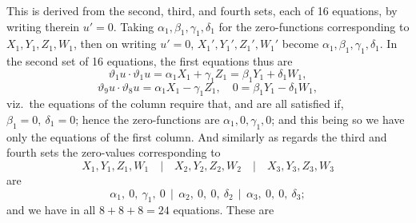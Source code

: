 \documentclass[11pt]{article}
\begin{document}
This is derived from the second, third, and fourth sets, each of 16 equations, by writing therein $u' = 0$. Taking $\alpha_1,\beta_1,\gamma_1,\delta_1$ for the zero-functions corresponding to $X_1, Y_1, Z_1, W_1$, then on writing $u' = 0$, $X_1', Y_1', Z_1', W_1'$ become $\alpha_1,\beta_1,\gamma_1,\delta_1$. In the second set of 16 equations, the first equations thus are
\[
\vartheta_1 u\cdot\vartheta_1 u = \alpha_1 X_1 + \gamma_1 Z_1 = \beta_1 Y_1 + \delta_1 W_1,
\]
\[
\vartheta_9 u\cdot\vartheta_8 u = \alpha_1 X_1 - \gamma_1 Z_1,\quad 0 = \beta_1 Y_1 - \delta_1 W_1,
\]
viz.\ the equations of the column require that, and are all satisfied if, $\beta_1 = 0,\ \delta_1 = 0$; hence the zero-functions are $\alpha_1, 0, \gamma_1, 0$; and this being so we have only the equations of the first column. And similarly as regards the third and fourth sets the zero-values corresponding to
\[
X_1, Y_1, Z_1, W_1\quad|\quad X_2, Y_2, Z_2, W_2\quad|\quad X_3, Y_3, Z_3, W_3
\]
are
\[
\alpha_1,\ 0,\ \gamma_1,\ 0\ \ |\ \ \alpha_2,\ 0,\ 0,\ \delta_2\ \ |\ \ \alpha_3,\ 0,\ 0,\ \delta_3;
\]
and we have in all $8 + 8 + 8 = 24$ equations. These are
\end{document}
